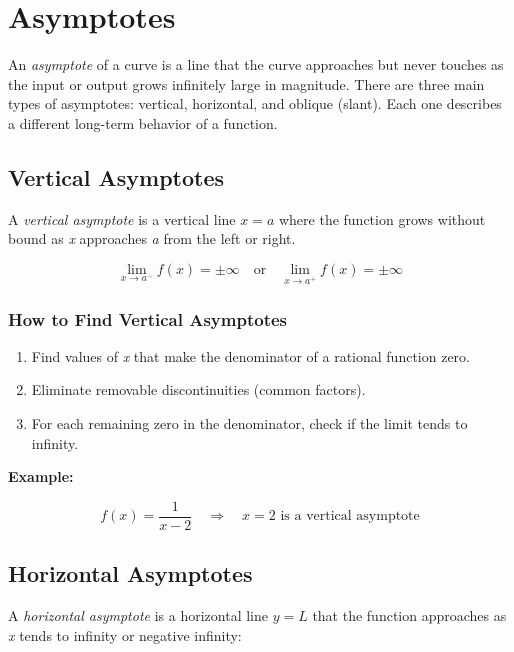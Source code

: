 \newpage
\section{Asymptotes}

An \emph{asymptote} of a curve is a line that the curve approaches but never touches as the input 
or output grows infinitely large in magnitude. There are three main types of asymptotes: vertical, 
horizontal, and oblique (slant). Each one describes a different long-term behavior of a function.

\subsection{Vertical Asymptotes}

A \emph{vertical asymptote} is a vertical line \(x = a\) where the function grows without bound 
as \emph{x} approaches \emph{a} from the left or right.

\[
    \lim_{x \to a^-} f(x) = \pm \infty \quad \text{or} \quad \lim_{x \to a^+} f(x) = \pm \infty
\]

\subsubsection{How to Find Vertical Asymptotes}

\begin{enumerate}

    \item Find values of \emph{x} that make the denominator of a rational function zero.

    \item Eliminate removable discontinuities (common factors).

    \item For each remaining zero in the denominator, check if the limit tends to infinity.

\end{enumerate}

\textbf{Example:}
\vspace{\baselineskip}

\[
    f(x) = \frac{1}{x - 2} \quad \Rightarrow \quad x = 2 \text{ is a vertical asymptote}
\]

\subsection{Horizontal Asymptotes}

A \emph{horizontal asymptote} is a horizontal line \(y = L\) that the function approaches as \emph{x} 
tends to infinity or negative infinity:

